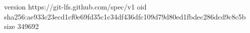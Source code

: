 version https://git-lfs.github.com/spec/v1
oid sha256:ae933c23ecd1cf0e69fd35c1c34df436dfc109d79d80ed1fbdec286dcd9c8c5b
size 349692
